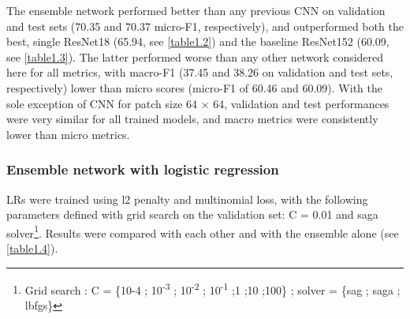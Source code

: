 The ensemble network performed better than any previous CNN on validation and test sets (70.35 and 70.37 micro-F1, respectively), and outperformed both the best, single ResNet18 (65.94, see \autoref{table1.2}) and the baseline ResNet152 (60.09, see \autoref{table1.3}). The latter performed worse than any other network considered here for all metrics, with macro-F1 (37.45 and 38.26 on validation and test sets, respectively) lower than micro scores (micro-F1 of 60.46 and 60.09). With the sole exception of CNN for patch size 64 \(\times\) 64, validation and test performances were very similar for all trained models, and macro metrics were consistently lower than micro metrics.

\subsubsection{Ensemble network with logistic regression}\label{chapitre1_6.2.2}
LRs were trained using l2 penalty and multinomial loss, with the following parameters defined with grid search on the validation set: C = 0.01 and saga solver\footnote{Grid search : C = \{10-4 ; 10\textsuperscript{-3} ; 10\textsuperscript{-2} ; 10\textsuperscript{-1} ;1 ;10 ;100\} ; solver = \{sag ; saga ; lbfgs\}}. Results were compared with each other and with the ensemble alone (see \autoref{table1.4}).

